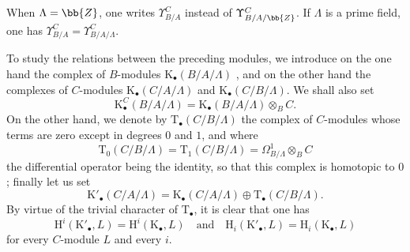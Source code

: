 \begin{env}[20.6.14]
When $\Lambda=\bb{Z}$, one writes $\Upsilon^C_{B/A}$ instead of $\Upsilon^C_{B/A/\bb{Z}}$.
If $\Lambda$ is a prime field, one has $\Upsilon^C_{B/A}=\Upsilon^C_{B/A/\Lambda}$.
\end{env}

\begin{env}[20.6.15]
\label{0.20.6.15}
To study the relations between the preceding modules, we introduce on the one hand the complex of $B$-modules $\mathrm{K}_\bullet(B/A/\Lambda)$ , and on the other hand the complexes
of $C$-modules $\mathrm{K}_\bullet(C/A/\Lambda)$ and $\mathrm{K}_\bullet(C/B/\Lambda)$.
We shall also set
\begin{equation}
\tag{20.6.15.1}
  \label{0.20.6.15.1}
  \mathrm{K}^C_\bullet(B/A/\Lambda)=\mathrm{K}_\bullet(B/A/\Lambda)\otimes_B C.
\end{equation}
On the other hand, we denote by $\mathrm{T}_\bullet(C/B/\Lambda)$ the complex of $C$-modules whose terms are zero except in degrees $0$ and $1$, and where
\begin{equation}
\tag{20.6.15.2}
  \label{0.20.6.15.2}
  \mathrm{T}_0(C/B/\Lambda)=\mathrm{T}_1(C/B/\Lambda)=\Omega^1_{B/\Lambda}\otimes_B C
\end{equation}
the differential operator being the identity, so that this complex is homotopic to $0$; finally let us set
\begin{equation}
\tag{20.6.15.3}
  \label{0.20.6.15.3}
  \mathrm{K}'_\bullet(C/A/\Lambda)=\mathrm{K}_\bullet(C/A/\Lambda)\oplus\mathrm{T}_\bullet(C/B/\Lambda).
\end{equation}
By virtue of the trivial character of $\mathrm{T}_\bullet$, it is clear that one has
\begin{equation}
\tag{20.6.15.4}
  \label{0.20.6.15.4}
  \mathrm{H}^i(\mathrm{K}'_\bullet,L)=\mathrm{H}^i(\mathrm{K}_\bullet,L)\quad\text{and}\quad\mathrm{H}_i(\mathrm{K}'_\bullet,L)=\mathrm{H}_i(\mathrm{K}_\bullet,L)
\end{equation}
for every $C$-module $L$ and every $i$.
\end{env}

